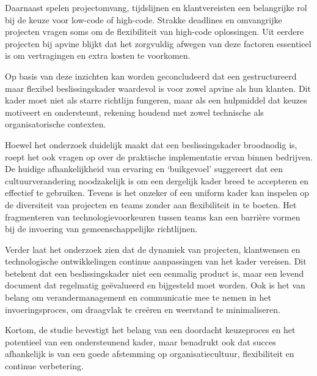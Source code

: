 Daarnaast spelen projectomvang, tijdslijnen en klantvereisten een belangrijke rol bij de keuze voor low-code of high-code. Strakke deadlines en omvangrijke projecten vragen soms om de flexibiliteit van high-code oplossingen. Uit eerdere projecten bij apvine blijkt dat het zorgvuldig afwegen van deze factoren essentieel is om vertragingen en extra kosten te voorkomen.

Op basis van deze inzichten kan worden geconcludeerd dat een gestructureerd maar flexibel beslissingskader waardevol is voor zowel apvine als hun klanten. Dit kader moet niet als starre richtlijn fungeren, maar als een hulpmiddel dat keuzes motiveert en ondersteunt, rekening houdend met zowel technische als organisatorische contexten.

\bigskip

Hoewel het onderzoek duidelijk maakt dat een beslissingskader broodnodig is, roept het ook vragen op over de praktische implementatie ervan binnen bedrijven. De huidige afhankelijkheid van ervaring en ‘buikgevoel’ suggereert dat een cultuurverandering noodzakelijk is om een dergelijk kader breed te accepteren en effectief te gebruiken. Tevens is het onzeker of een uniform kader kan inspelen op de diversiteit van projecten en teams zonder aan flexibiliteit in te boeten. Het fragmenteren van technologievoorkeuren tussen teams kan een barrière vormen bij de invoering van gemeenschappelijke richtlijnen.

Verder laat het onderzoek zien dat de dynamiek van projecten, klantwensen en technologische ontwikkelingen continue aanpassingen van het kader vereisen. Dit betekent dat een beslissingskader niet een eenmalig product is, maar een levend document dat regelmatig geëvalueerd en bijgesteld moet worden. Ook is het van belang om verandermanagement en communicatie mee te nemen in het invoeringsproces, om draagvlak te creëren en weerstand te minimaliseren.

Kortom, de studie bevestigt het belang van een doordacht keuzeproces en het potentieel van een ondersteunend kader, maar benadrukt ook dat succes afhankelijk is van een goede afstemming op organisatiecultuur, flexibiliteit en continue verbetering.

